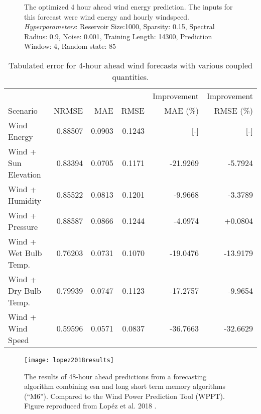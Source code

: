 \begin{figure*}[h]
  \centering
  
  \caption{The optimized 4 hour ahead wind energy prediction. The inputs for this forecast were wind energy and hourly windspeed. \textit{Hyperparameters}: Reservoir Size:1000, Sparsity: 0.15, Spectral Radius: 0.9, Noise: 0.001, Training Length: 14300, Prediction Window: 4, Random state: 85}
  \label{fig:wind04}
\end{figure*}
\FloatBarrier
  \begin{table*}[h]
    \centering
    \caption{Tabulated error for 4-hour ahead wind forecasts with various coupled quantities.}
    \label{tab:wind04}
    \begin{tabular}{lrrrrr}
      \hline
      & & & & Improvement & Improvement \\
      Scenario &NRMSE & MAE & RMSE & MAE (\%) & RMSE (\%)\\
      \hline
      Wind Energy & 0.88507 &0.0903 & 0.1243 & [-] & [-] \\
      Wind + Sun Elevation & 0.83394 &0.0705 & 0.1171 & -21.9269 & -5.7924 \\
      Wind + Humidity & 0.85522 & 0.0813 & 0.1201 & -9.9668 & -3.3789 \\
      Wind + Pressure & 0.88587 & 0.0866 & 0.1244 & -4.0974 & +0.0804 \\
      Wind + Wet Bulb Temp. & 0.76203 & 0.0731 & 0.1070 & -19.0476 & -13.9179 \\
      Wind + Dry Bulb Temp. & 0.79939 & 0.0747 & 0.1123 & -17.2757 & -9.9654 \\
      Wind + Wind Speed & 0.59596 & 0.0571 & 0.0837 & -36.7663 & -32.6629 \\
      \hline
    \end{tabular}
  \end{table*}
\begin{figure*}
  \texttt{[image: lopez2018results]}
  \caption{The results of 48-hour ahead predictions from a forecasting algorithm combining \gls{esn}
  and long short term memory algorithms (``M6''). Compared to the Wind Power Prediction
  Tool (WPPT). Figure reproduced from Lop\'ez et al. 2018
  \cite{lopez_wind_2018}.}
  \label{fig:lopez2018}
\end{figure*}
\FloatBarrier
